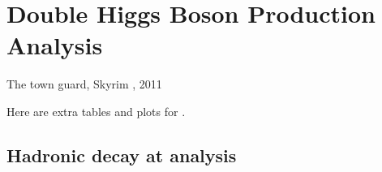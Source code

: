 \chapter{Double Higgs Boson Production Analysis}
\label{app:doubleHiggs}

{The town guard, Skyrim \cite{Skyrim}, 2011}


Here are extra tables and plots for .

\section{Hadronic decay at  analysis}

